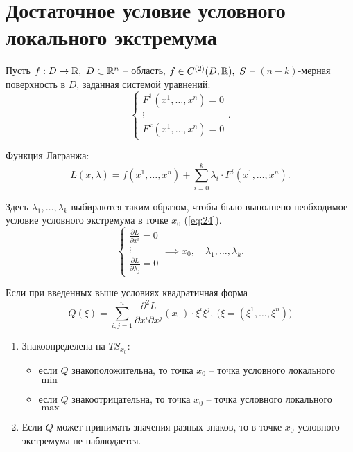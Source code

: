 

\section*{Достаточное условие условного локального экстремума}

\begin{note}
    Пусть $f:D\rightarrow\mathbb{R}, \ D \subset \mathbb{R}^n$ -- область, $f \in C^{(2)} (D,\mathbb{R}), \ S$ -- $(n-k)$-мерная поверхность в $D$, заданная системой уравнений:
    \[
        \left\{\begin{array}{l}
            F^1(x^1,\ldots,x^n) = 0 \\
            \vdots                  \\
            F^k(x^1,\ldots,x^n) = 0
        \end{array}\right..
    \]

    Функция Лагранжа:
    \[
        L(x,\lambda) = f(x^1,\ldots,x^n) + \sum_{i = 0}^{k}\lambda_i \cdot F^i(x^1,\ldots,x^n).
    \]

    Здесь $\lambda_1,\ldots,\lambda_k$ выбираются таким образом, чтобы было выполнено необходимое условие условного экстремума в точке $x_0$ (\ref{eq:24}).
    \[
        \left\{\begin{array}{l}
            \frac{\partial L}{\partial x^i} = 0 \\
            \vdots                          \\
            \frac{\partial L}{\partial \lambda_j} = 0
        \end{array}\right. \implies x_0,\quad \lambda_1,\ldots,\lambda_k.
    \]
\end{note}

\begin{theorem}
    Если при введенных выше условиях квадратичная форма
    \[
        Q(\xi) = \sum_{i,j=1}^{n}\frac{\partial^2 L}{\partial x^i \partial x^j}(x_0)\cdot\xi^i\xi^j,\ \big(\xi=(\xi^1,\ldots,\xi^n)\big)
    \]
    \begin{enumerate}
        \item Знакоопределена на $TS_{x_0}$:
              \begin{itemize}
                  \item если $Q$ знакоположительна, то точка $x_0$ -- точка условного локального $\min$
                  \item если $Q$ знакоотрицательна, то точка $x_0$ -- точка условного локального $\max$
              \end{itemize}
        \item Если $Q$ может принимать значения разных знаков, то в точке $x_0$ условного экстремума не наблюдается.
    \end{enumerate}
\end{theorem}

